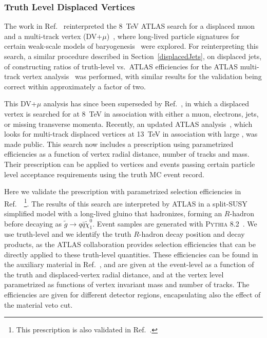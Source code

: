 \subsubsection{Truth Level Displaced Vertices}

The work in Ref.~\cite{Cui:2014twa} reinterpreted the 8~TeV ATLAS search for a displaced muon and a multi-track vertex (DV+$\mu$)~\cite{ATLAS-CONF-2013-092}, where long-lived particle signatures for certain weak-scale models of baryogenesis~\cite{Cui:2012jh,Cui:2013bta,Cui:2014twa} were explored. For reinterpreting this search, a similar procedure described in Section~\ref{displacedJets}, on displaced jets, of constructing ratios of truth-level vs.~ATLAS efficiencies for the ATLAS multi-track vertex analysis~\cite{ATLAS-CONF-2013-092} was performed, with similar results for the validation being correct within approximately a factor of two.

This DV+$\mu$ analysis has since been superseded by Ref.~\cite{Aad:2015rba}, in which a displaced vertex is searched for at 8~TeV in association with either a muon, electrons, jets, or missing transverse momenta. Recently, an updated ATLAS analysis~\cite{Aaboud:2017iio}, which looks for multi-track displaced vertices at 13~TeV in association with large \met, was made public. This search now includes a prescription using parametrized efficiencies as a function of vertex radial distance, number of tracks and mass. Their prescription can be applied to vertices and events passing certain particle level acceptance requirements using the truth MC event record.

Here we validate the prescription with parametrized selection efficiencies
in Ref.~\cite{Aaboud:2017iio}~\footnote{This prescription is also validated in
Ref.~\cite{LesHouches2017}.}. The results of this search are interpreted by ATLAS in a split-SUSY simplified model with a long-lived gluino that hadronizes, forming an $R$-hadron before decaying as $\tilde{g}\rightarrow q\bar{q}\tilde{\chi}^{0}_{1}$. Event samples are generated with \textsc{Pythia 8.2}~\cite{Sjostrand:2014zea}. We use truth-level \met and we identify the truth $R$-hadron decay position and decay products, as the ATLAS collaboration provides selection efficiencies that can be directly applied to these truth-level quantities. These efficiencies can be found in the auxiliary material in Ref.~\cite{SUSY-2016-08}, and are given at the event-level as a function of the truth \met and displaced-vertex radial distance, and at the vertex level parametrized as functions of vertex invariant mass and number of tracks. The efficiencies are given for different detector regions, encapsulating also the effect of the material veto cut.

